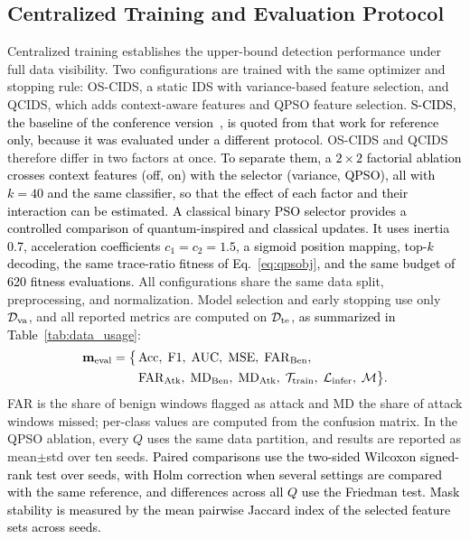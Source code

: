 \documentclass[conference]{IEEEtran}
\begin{document}
\subsection{Centralized Training and Evaluation Protocol}
\label{subsec:centralized_method}
Centralized training establishes the upper-bound detection
performance under full data visibility. 
Two configurations are trained with the same optimizer and stopping
rule: OS-CIDS, a static IDS with variance-based feature selection,
and QCIDS, which adds context-aware features and QPSO feature
selection. \textcolor{black}{S-CIDS, the baseline of the conference
version~\cite{ajakweconquest}, is quoted from that work for reference
only, because it was evaluated under a different protocol.}
OS-CIDS and QCIDS therefore differ in two factors at once.
\textcolor{black}{To separate them, a $2\times2$ factorial
ablation crosses context features (off, on) with the selector
(variance, QPSO), all with $k=40$ and the same classifier, so that the
effect of each factor and their interaction can be estimated. A
classical binary PSO selector provides a controlled comparison of
quantum-inspired and classical updates. It uses inertia 0.7,
acceleration coefficients $c_1=c_2=1.5$, a sigmoid position mapping,
top-$k$ decoding, the same trace-ratio fitness of Eq.~\eqref{eq:qpsobj}, and the
same budget of 620 fitness evaluations.} All configurations share
the same data split, preprocessing, and normalization. Model
selection and early stopping use only $\mathcal{D}_{\rm va}$, and all
reported metrics are computed on $\mathcal{D}_{\rm te}$,
\textcolor{black}{as summarized in Table~\ref{tab:data_usage}}:
\begin{align}
\mathbf{m}_{\rm eval} = \bigl\{
&\,\mathrm{Acc},\;\mathrm{F1},\;\mathrm{AUC},\;\mathrm{MSE},\;
  \mathrm{FAR}_{\rm Ben},\nonumber\\
&\,\mathrm{FAR}_{\rm Atk},\;\mathrm{MD}_{\rm Ben},\;
  \mathrm{MD}_{\rm Atk},\;
  \mathcal{T}_{\rm train},\;\textcolor{black}{\mathcal{L}_{\rm infer},\;\mathcal{M}}
\bigr\}.
\label{eq:central_metrics}
\end{align}
FAR is the share of benign windows flagged as attack and MD the share
of attack windows missed; per-class values are computed from the confusion
matrix. In the
QPSO ablation, every $Q$ uses the same data partition, and results
are reported as mean$\pm$std over ten seeds.
\textcolor{black}{Paired comparisons use the two-sided
Wilcoxon signed-rank test over seeds, with Holm correction when
several settings are compared with the same reference, and
differences across all $Q$ use the Friedman test. Mask stability is
measured by the mean pairwise Jaccard index of the selected feature
sets across seeds.}
\end{document}
